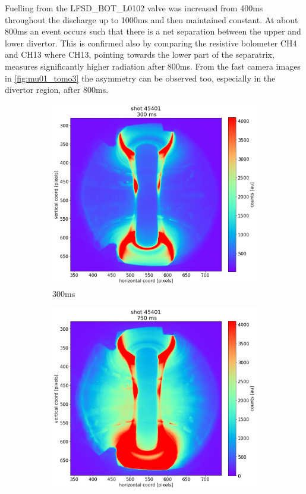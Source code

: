 Fuelling from the LFSD\_BOT\_L0102 valve was increased from 400ms throughout the discharge up to 1000ms and then maintained constant. At about 800ms an event occurs such that there is a net separation between the upper and lower divertor. This is confirmed also by comparing the resistive bolometer CH4 and CH13 where CH13, pointing towards the lower part of the separatrix, measures significantly higher radiation after 800ms. From the fast camera images in \autoref{fig:mu01_tomo3} the asymmetry can be observed too, especially in the divertor region, after 800ms.
\begin{figure}[!ht]
    \centering
    \begin{subfigure}{0.3\linewidth}
         \centering
         \includegraphics[trim={60 0 120 60},clip,width=\textwidth]{Chapters/chapter2/figs/45401_for_paper_300ms.png}
         \caption{300ms}
         \label{fig:mu01_tomo3a}
    \end{subfigure}
    \begin{subfigure}{0.3\linewidth}
         \centering
         \includegraphics[trim={60 0 120 60},clip,width=\textwidth]{Chapters/chapter2/figs/45401_for_paper_750ms.png}

\end{subfigure}
\end{figure}

